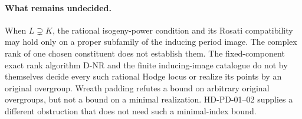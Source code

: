 \paragraph{What remains undecided.}
When $L\supsetneq K$, the rational isogeny-power condition and its
Rosati compatibility may hold only on a proper subfamily of the
inducing period image.  The complex rank of one chosen constituent
does not establish them.  The fixed-component exact rank algorithm
D-NR and the finite inducing-image catalogue do not by themselves
decide every such rational Hodge locus or realize its points by
an original overgroup.  Wreath padding refutes a bound on arbitrary
original overgroups, but not a bound on a minimal realization.
HD-PD-01--02 supplies a different obstruction that does not need
such a minimal-index bound.
